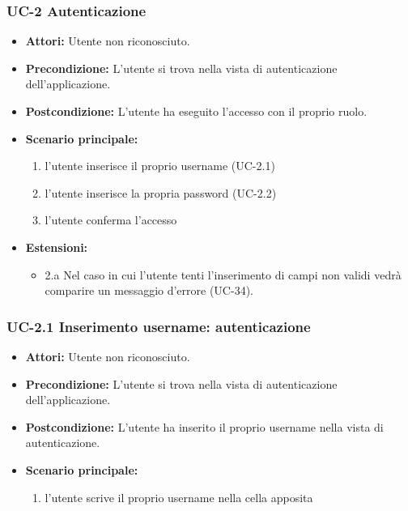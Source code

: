 \subsubsection{UC-2 Autenticazione}
		\begin{itemize}
			\item \textbf{Attori:} Utente non riconosciuto.
			\item \textbf{Precondizione:} L'utente si trova nella vista di autenticazione dell'applicazione.
			\item \textbf{Postcondizione:} L'utente ha eseguito l'accesso con il proprio ruolo.
			\item \textbf{Scenario principale:}
				\begin{enumerate}
					\item l'utente inserisce il proprio username (UC-2.1)
					\item l'utente inserisce la propria password (UC-2.2)
					\item l'utente conferma l'accesso
				\end{enumerate}
				\item \textbf{Estensioni:}
				\begin{itemize}
					\item 2.a Nel caso in cui l'utente tenti l'inserimento di campi non validi vedrà comparire un messaggio d'errore (UC-34).
				\end{itemize}
		\end{itemize}

\subsubsection{UC-2.1 Inserimento username: autenticazione}
\begin{itemize}
	\item \textbf{Attori:} Utente non riconosciuto.
			\item \textbf{Precondizione:} L'utente si trova nella vista di autenticazione dell'applicazione.
			\item \textbf{Postcondizione:} L'utente ha inserito il proprio username nella vista di autenticazione.
			\item \textbf{Scenario principale:}
				\begin{enumerate}
					\item l'utente scrive il proprio username nella cella apposita
				\end{enumerate}
\end{itemize}

